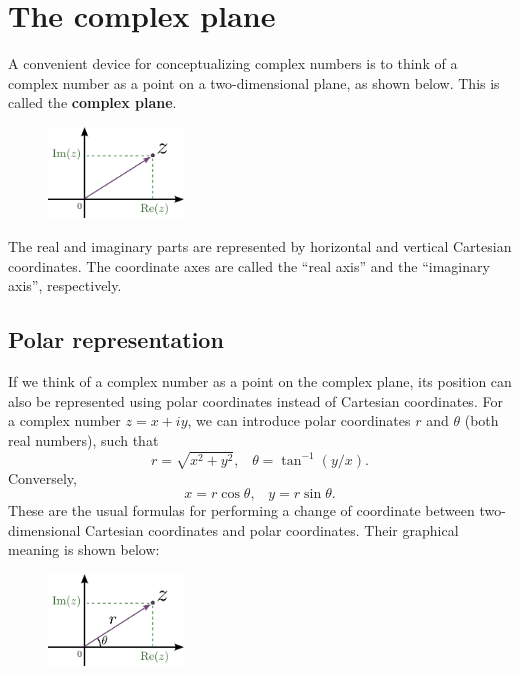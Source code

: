 \documentclass[10pt,a4paper]{article}
\begin{document}
\section{The complex plane}\label{the-complex-plane}

A convenient device for conceptualizing complex numbers is to think of
a complex number as a point on a two-dimensional plane, as shown
below.  This is called the \textbf{complex plane}.

\begin{figure}[h]
  \centering\includegraphics[width=0.32\textwidth]{complex_plane}
\end{figure}

\noindent
The real and imaginary parts are represented by horizontal and
vertical Cartesian coordinates.  The coordinate axes are called the
``real axis'' and the ``imaginary axis'', respectively.

\subsection{Polar representation}\label{polar-representation}

If we think of a complex number as a point on the complex plane, its
position can also be represented using polar coordinates instead of
Cartesian coordinates. For a complex number $z = x + i y$, we can
introduce polar coordinates $r$ and $\theta$ (both real numbers), such
that
\begin{equation}
  r = \sqrt{x^2 + y^2}, \;\;\; \theta = \tan^{-1}(y/x).
\end{equation}
Conversely,
\begin{equation}
  x = r\cos\theta, \;\;\; y = r\sin\theta.
\end{equation}
These are the usual formulas for performing a change of coordinate
between two-dimensional Cartesian coordinates and polar coordinates.
Their graphical meaning is shown below:

\begin{figure}[h]
  \centering\includegraphics[width=0.32\textwidth]{complex_plane2}
\end{figure}
\end{document}
